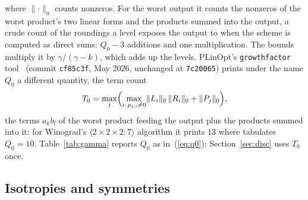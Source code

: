 \documentclass[11pt]{article}
\theoremstyle{remark}
\newcommand{\nnz}[1]{\lVert #1\rVert_0}
\newcommand{\mm}[1]{\langle #1\rangle}
\begin{document}
where $\nnz{\cdot}$ counts nonzeros.  For the worst output it counts
the nonzeros of the worst product's two linear forms and the products
summed into the output, a crude count of the roundings a level exposes
the output to when the scheme is computed as direct sums: $Q_0-3$
additions and one multiplication.  The bounds multiply it by
$\gamma/(\gamma-k)$, which adds up the levels.  PLinOpt's
\texttt{growthfactor} tool~\cite{PLinOpt} (commit \texttt{cf85c3f}, May
2026, unchanged at \texttt{7c20065}) prints under the name $Q_0$ a
different quantity, the term count
\begin{equation}\label{eq:t0}
T_0=\max_j\Bigl(\max_{i:\,p_{j,i}\ne0}\nnz{L_i}\,\nnz{R_i}+\nnz{P_j}\Bigr),
\end{equation}
the terms $a_kb_l$ of the worst product feeding the output plus the
products summed into it: for Winograd's $\mm{2\times2\times2:7}$
algorithm it prints $13$ where \cite{DPS24} tabulates $Q_0=10$.
Table~\ref{tab:gamma} reports $Q_0$ as in~(\ref{eq:q0});
Section~\ref{sec:disc} uses $T_0$ once.

\subsection{Isotropies and symmetries}
\end{document}
